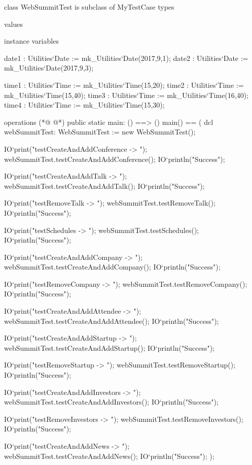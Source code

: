 \begin{vdmpp}[breaklines=true]
class WebSummitTest is subclass of MyTestCase
types

values

instance variables

 date1 : Utilities`Date := mk_Utilities`Date(2017,9,1);
 date2 : Utilities`Date := mk_Utilities`Date(2017,9,3);
 
 time1 : Utilities`Time := mk_Utilities`Time(15,20);
 time2 : Utilities`Time := mk_Utilities`Time(15,40);
 time3 : Utilities`Time := mk_Utilities`Time(16,40);
 time4 : Utilities`Time := mk_Utilities`Time(15,30);
 
operations
(*@
\label{main:17}
@*)
public static main: () ==> ()
 main() ==
 (
  dcl webSummitTest: WebSummitTest := new WebSummitTest();
  
  IO`print("testCreateAndAddConference -> ");
  webSummitTest.testCreateAndAddConference();
  IO`println("Success");
  
  IO`print("testCreateAndAddTalk -> ");
  webSummitTest.testCreateAndAddTalk();
  IO`println("Success");
  
  IO`print("testRemoveTalk -> ");
  webSummitTest.testRemoveTalk();
  IO`println("Success");
  
  IO`print("testSchedules -> ");
  webSummitTest.testSchedules();
  IO`println("Success");
  
  IO`print("testCreateAndAddCompany -> ");
  webSummitTest.testCreateAndAddCompany();
  IO`println("Success");
  
  IO`print("testRemoveCompany -> ");
  webSummitTest.testRemoveCompany();
  IO`println("Success");
  
  IO`print("testCreateAndAddAttendee -> ");
  webSummitTest.testCreateAndAddAttendee();
  IO`println("Success");
  
  IO`print("testCreateAndAddStartup -> ");
  webSummitTest.testCreateAndAddStartup();
  IO`println("Success");
  
  IO`print("testRemoveStartup -> ");
  webSummitTest.testRemoveStartup();
  IO`println("Success");
  
  IO`print("testCreateAndAddInvestors -> ");
  webSummitTest.testCreateAndAddInvestors();
  IO`println("Success");
  
  IO`print("testRemoveInvestors -> ");
  webSummitTest.testRemoveInvestors();
  IO`println("Success");
  
  IO`print("testCreateAndAddNews -> ");
  webSummitTest.testCreateAndAddNews();
  IO`println("Success");
 );
 

\end{vdmpp}
